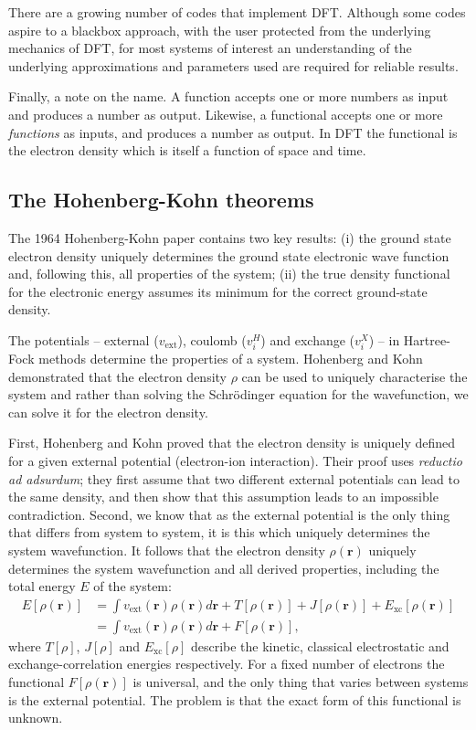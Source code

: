 There are a growing number of codes that implement DFT. 
Although some codes aspire to a blackbox approach, with the user protected from the underlying mechanics of DFT, for most systems of interest an understanding of the underlying approximations and parameters used are required for reliable results.

Finally, a note on the name. A function accepts one or more numbers as input and produces a number as output. Likewise, a functional accepts one or more \textit{functions} as inputs, and produces a number as output. In DFT the functional is the electron density which is itself a function of space and time.

\subsection{The Hohenberg-Kohn theorems}

The 1964 Hohenberg-Kohn paper\autocite{Hohenberg1964} contains two key results: (i) the ground state electron density uniquely determines the ground state electronic wave function and, following this, all properties of the system; (ii) the true density functional for the electronic energy assumes its minimum for the correct ground-state density.\autocite{Scuseria05}

The potentials -- external ($v_\mathrm{ext}$), coulomb ($v_i^H$) and exchange ($v_i^X$) -- in Hartree-Fock methods determine the properties of a system. Hohenberg and Kohn demonstrated that the electron density $\rho$ can be used to uniquely characterise the system and rather than solving the Schr\"{o}dinger equation for the wavefunction, we can solve it for the electron density.

First, Hohenberg and Kohn proved that the electron density is uniquely defined for a given external potential (electron-ion interaction). Their proof uses \textit{reductio ad adsurdum}; they first assume that two different external potentials can lead to the same density, and then show that this assumption leads to an impossible contradiction.\autocite{Burke2007} 
Second, we know that as the external potential is the only thing that differs from system to system, it is this which uniquely determines the system wavefunction. It follows that the electron density $\rho(\textbf{r})$ uniquely determines the system wavefunction and all derived properties, including the total energy $E$ of the system:\autocite{Kaxiras2007}
\begin{align}
E\left[\rho(\textbf{r})\right]&=\int v_{\textrm{ext}}(\textbf{r})\rho(\textbf{r})d\textbf{r}+T\left[\rho(\textbf{r})\right]+J\left[\rho(\textbf{r})\right]+E_{\textrm{xc}}\left[\rho(\textbf{r})\right] \\
&=\int v_{\textrm{ext}}(\textbf{r})\rho(\textbf{r})d\textbf{r}+F\left[\rho(\textbf{r})\right],   
\end{align}
where $T\left[\rho\right]$, $J\left[\rho\right]$ and $E_\textrm{xc}\left[\rho\right]$ describe the kinetic, classical electrostatic and exchange-correlation energies respectively. 
For a fixed number of electrons the functional $F\left[\rho(\textbf{r})\right]$ is universal, and the only thing that varies between systems is the external potential. The problem is that the exact form of this functional is unknown.


